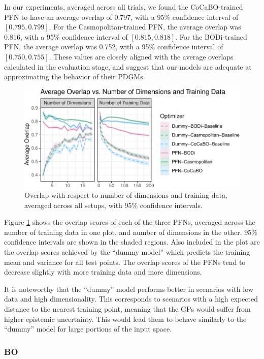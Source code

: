 \documentclass[12pt,twoside]{reedthesis}
\begin{document}
In our experiments, averaged across all trials, we found the CoCaBO-trained PFN to have an average overlap of 0.797, with a 95\% confidence interval of \([0.795, 0.799]\). For the Casmopolitan-trained PFN, the average overlap was 0.816, with a 95\% confidence interval of \([0.815, 0.818]\). For the BODi-trained PFN, the average overlap was 0.752, with a 95\% confidence interval of \([0.750, 0.755]\). These values are closely aligned with the average overlaps calculated in the evaluation stage, and suggest that our models are adequate at approximating the behavior of their PDGMs.
\begin{figure}
\centering
\includegraphics{thesis_files/figure-latex/overlap-experiment-plot-1.pdf}
\caption{\label{fig:overlap-experiment-plot}Overlap with respect to number of dimensions and training data, averaged across all setups, with 95\% confidence intervals.}
\end{figure}
Figure \ref{fig:overlap-experiment-plot} shows the overlap scores of each of the three PFNs, averaged across the number of training data in one plot, and number of dimensions in the other. 95\% confidence intervals are shown in the shaded regions. Also included in the plot are the overlap scores achieved by the ``dummy model'' which predicts the training mean and variance for all test points. The overlap scores of the PFNs tend to decrease slightly with more training data and more dimensions.

It is noteworthy that the ``dummy'' model performs better in scenarios with low data and high dimensionality. This corresponds to scenarios with a high expected distance to the nearest training point, meaning that the GPs would suffer from higher epistemic uncertainty. This would lead them to behave similarly to the ``dummy'' model for large portions of the input space.

\hypertarget{bo}{%
\subsubsection{BO}\label{bo}}
\end{document}
